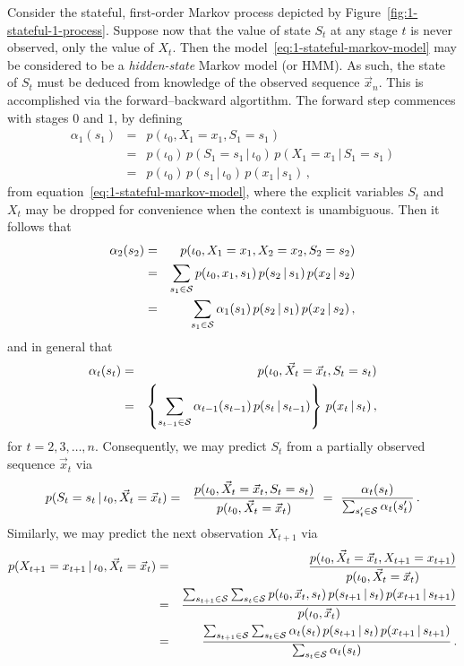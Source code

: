 \documentclass[a4paper]{article}
\begin{document}
Consider the stateful, first-order Markov process depicted by Figure~\ref{fig:1-stateful-1-process}.
Suppose now that the value of state $S_t$ at any stage $t$ is never observed, only the value of $X_t$.
Then the model~\eqref{eq:1-stateful-markov-model} may be considered to be a {\em hidden-state} Markov model (or HMM).
As such, the state of $S_t$ must be deduced from knowledge of the observed sequence $\vec{x}_n$. This is accomplished
via the forward--backward algortithm. The forward step commences with stages $0$ and $1$, by defining
\begin{eqnarray}
  \alpha_1(s_1) & = & p(\iota_0,X_1=x_1,S_1=s_1)
\nonumber\\
& = & p(\iota_0)\,p(S_1=s_1\,|\,\iota_0)\,p(X_1=x_1\,|\,S_1=s_1)
\nonumber\\
& = & p(\iota_0)\,p(s_1\,|\,\iota_0)\,p(x_1\,|\,s_1)
\,,
\end{eqnarray}
from equation~\eqref{eq:1-stateful-markov-model}, where the explicit variables $S_t$ and $X_t$ may be
dropped for convenience when the context is unambiguous.
Then it follows that
\begin{eqnarray}
  \alpha_2(s_2) & = & p(\iota_0,X_1=x_1,X_2=x_2,S_2=s_2)
\nonumber\\
& = & \sum_{s_1\in{\cal S}}p(\iota_0,x_1,s_1)\,p(s_2\,|\,s_1)\,p(x_2\,|\,s_2)
\nonumber\\
& = & \sum_{s_1\in{\cal S}}\alpha_1(s_1)\,p(s_2\,|\,s_1)\,p(x_2\,|\,s_2)\,,
\end{eqnarray}
and in general that
\begin{eqnarray}
   \alpha_t(s_t) & = & p(\iota_0,\vec{X}_t=\vec{x}_t,S_t=s_t)
\nonumber\\
& = & \left\{\sum_{s_{t-1}\in{\cal S}}\alpha_{t-1}(s_{t-1})\,p(s_t\,|\,s_{t-1})\right\}\,p(x_t\,|\,s_t)\,,
\end{eqnarray}
for $t=2,3,\ldots,n$.
Consequently, we may predict $S_t$ from a partially observed sequence $\vec{x}_t$ via
\begin{eqnarray}
  p(S_t=s_t\,|\,\iota_0,\vec{X}_t=\vec{x}_t) & = & \frac{p(\iota_0,\vec{X}_t=\vec{x}_t,S_t=s_t)}
     {p(\iota_0,\vec{X}_t=\vec{x}_t)}
~=~\frac{\alpha_t(s_t)}{\sum_{s_t'\in{\cal S}}\alpha_t(s_t')}\,.
\end{eqnarray}
Similarly, we may predict the next observation $X_{t+1}$ via
\begin{eqnarray}
  p(X_{t+1}=x_{t+1}\,|\,\iota_0,\vec{X}_t=\vec{x}_t) 
& = &
  \frac{p(\iota_0,\vec{X}_t=\vec{x}_t,X_{t+1}=x_{t+1})}{p(\iota_0,\vec{X}_t=\vec{x}_t)}
\nonumber\\
& = & 
 \frac{\sum_{s_{t+1}\in{\cal S}}\sum_{s_{t}\in{\cal S}}p(\iota_0,\vec{x}_t,s_t)\,p(s_{t+1}\,|\,s_t)\,p(x_{t+1}\,|\,s_{t+1})}
        {p(\iota_0,\vec{x}_t)}
\nonumber\\
& = &
  \frac{\sum_{s_{t+1}\in{\cal S}}\sum_{s_{t}\in{\cal S}}\alpha_t(s_t)\,p(s_{t+1}\,|\,s_t)\,p(x_{t+1}\,|\,s_{t+1})}{\sum_{s_t\in{\cal S}}\alpha_t(s_t)}\,.
\end{eqnarray}
\end{document}
